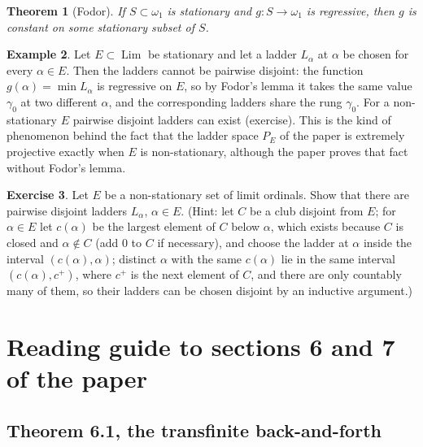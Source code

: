 \documentclass[12pt]{article}
\newtheorem{theorem}{Theorem}[section]
\theoremstyle{definition}
\newtheorem{example}[theorem]{Example}
\newtheorem{exercise}[theorem]{Exercise}
\theoremstyle{remark}
\newcommand{\Lim}{\operatorname{Lim}}
\begin{document}
\begin{theorem}[Fodor] If $S\subset\omega_1$ is stationary and $g:S\to\omega_1$
    is regressive, then $g$ is constant on some stationary subset of $S$.
\end{theorem}

\begin{example} Let $E\subset\Lim$ be stationary and let a ladder $L_\alpha$
    at $\alpha$ be chosen for every $\alpha\in E$. Then the ladders cannot be
    pairwise disjoint: the function $g(\alpha)=\min L_\alpha$ is regressive on
    $E$, so by Fodor's lemma it takes the same value $\gamma_0$ at two
    different $\alpha$, and the corresponding ladders share the rung
    $\gamma_0$. For a non-stationary $E$ pairwise disjoint ladders can exist
    (exercise). This is the kind of phenomenon behind the fact that the
    ladder space $P_E$ of the paper is extremely projective exactly when $E$ is
    non-stationary, although the paper proves that fact without Fodor's
    lemma.
\end{example}

\begin{exercise} Let $E$ be a non-stationary set of limit ordinals. Show that
    there are pairwise disjoint ladders $L_\alpha$, $\alpha\in E$. (Hint: let
    $C$ be a club disjoint from $E$; for $\alpha\in E$ let $c(\alpha)$ be the
    largest element of $C$ below $\alpha$, which exists because $C$ is closed
    and $\alpha\notin C$ (add $0$ to $C$ if necessary), and choose the ladder at $\alpha$ inside the
    interval $(c(\alpha),\alpha)$; distinct $\alpha$ with the same $c(\alpha)$
    lie in the same interval $(c(\alpha),c^+)$, where $c^+$ is the next element
    of $C$, and there are only countably many of them, so their ladders can
    be chosen disjoint by an inductive argument.)
\end{exercise}

\section{Reading guide to sections 6 and 7 of the paper}\label{SecReading}

\subsection*{Theorem 6.1, the transfinite back-and-forth}
\end{document}
